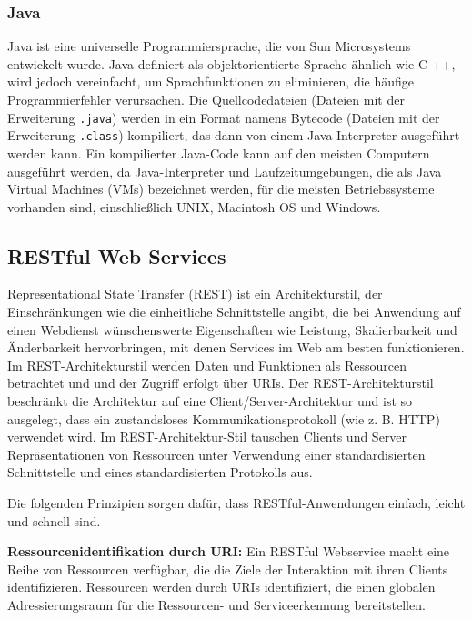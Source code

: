 \subsubsection{Java}

Java ist eine universelle Programmiersprache, die von Sun Microsystems entwickelt wurde. Java definiert als objektorientierte Sprache ähnlich wie C ++, wird jedoch vereinfacht, um Sprachfunktionen zu eliminieren, die häufige Programmierfehler verursachen. Die Quellcodedateien (Dateien mit der Erweiterung \texttt{.java}) werden in ein Format namens Bytecode (Dateien mit der Erweiterung \texttt{.class}) kompiliert, das dann von einem Java-Interpreter ausgeführt werden kann. Ein kompilierter Java-Code kann auf den meisten Computern ausgeführt werden, da Java-Interpreter und Laufzeitumgebungen, die als Java Virtual Machines (VMs) bezeichnet werden, für die meisten Betriebssysteme vorhanden sind, einschließlich UNIX, Macintosh OS und Windows\cite{java18beal}.

\subsection{RESTful Web Services}

Representational State Transfer (REST) ist ein Architekturstil, der Einschränkungen wie die einheitliche Schnittstelle angibt, die bei Anwendung auf einen Webdienst wünschenswerte Eigenschaften wie Leistung, Skalierbarkeit und Änderbarkeit hervorbringen, mit denen Services im Web am besten funktionieren. Im REST-Architekturstil werden Daten und Funktionen als Ressourcen betrachtet und und der Zugriff erfolgt über URIs. Der REST-Architekturstil beschränkt die Architektur auf eine Client/Server-Architektur und ist so ausgelegt, dass ein zustandsloses Kommunikationsprotokoll (wie z. B. HTTP) verwendet wird. Im REST-Architektur-Stil tauschen Clients und Server Repräsentationen von Ressourcen unter Verwendung einer standardisierten Schnittstelle und eines standardisierten Protokolls aus\cite{rws13od}.

Die folgenden Prinzipien sorgen dafür, dass RESTful-Anwendungen einfach, leicht und schnell sind.

\textbf{Ressourcenidentifikation durch URI:} Ein RESTful Webservice macht eine Reihe von Ressourcen verfügbar, die die Ziele der Interaktion mit ihren Clients identifizieren. Ressourcen werden durch URIs identifiziert, die einen globalen Adressierungsraum für die Ressourcen- und Serviceerkennung bereitstellen.

